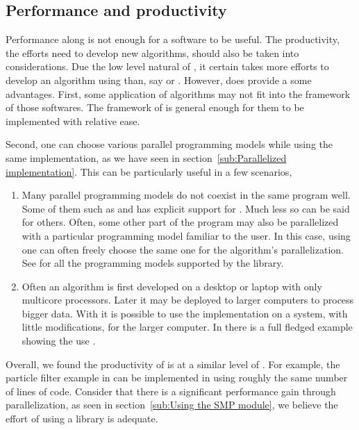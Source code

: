 \subsection{Performance and productivity}
\label{sub:Performance and productivity}

Performance along is not enough for a software to be useful. The productivity,
the efforts need to develop new algorithms, should also be taken into
considerations. Due the low level natural of \cpp, it certain takes more
efforts to develop an algorithm using \vsmc than, say \libbi or \biips.
However, \smc does provide a some advantages. First, some application of \smc
algorithms may not fit into the framework of those softwares. The framework of
\smc is general enough for them to be implemented with relative ease.

Second, one can choose various parallel programming models while using the
same implementation, as we have seen in section~\ref{sub:Parallelized
  implementation}. This can be particularly useful in a few scenarios,
\begin{enumerate}
  \item Many parallel programming models do not coexist in the same program
    well. Some of them such as \tbb and \cilk has explicit support for
    \openmp. Much less so can be said for others. Often, some other part of
    the program may also be parallelized with a particular programming model
    familiar to the user. In this case, using \vsmc one can often freely
    choose the same one for the \smc algorithm's parallelization. See
    \cite{vsmcjss} for all the programming models supported by the library.
  \item Often an algorithm is first developed on a desktop or laptop with only
    multicore processors. Later it may be deployed to larger computers to
    process bigger data. With \vsmc it is possible to use the implementation
    on a \smp system, with little modifications, for the larger computer. In
    \cite{vsmcjss} there is a full fledged example showing the use \mpi.
\end{enumerate}

Overall, we found the productivity of \vsmc is at a similar level of \smctc.
For example, the particle filter example in \cite{smctc} can be implemented in
\vsmc using roughly the same number of lines of code. Consider that there is a
significant performance gain through parallelization, as seen in
section~\ref{sub:Using the SMP module}, we believe the effort of using a \cpp
library is adequate.

